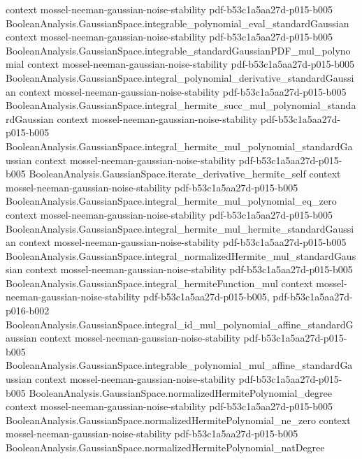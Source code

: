\begin{theorem}
  {context}
  {mossel-neeman-gaussian-noise-stability}
  {pdf-b53c1a5aa27d-p015-b005}
\proofstep
  {BooleanAnalysis.GaussianSpace.integrable_polynomial_eval_standardGaussian}
  {context}
  {mossel-neeman-gaussian-noise-stability}
  {pdf-b53c1a5aa27d-p015-b005}
\proofstep
  {BooleanAnalysis.GaussianSpace.integrable_standardGaussianPDF_mul_polynomial}
  {context}
  {mossel-neeman-gaussian-noise-stability}
  {pdf-b53c1a5aa27d-p015-b005}
\proofstep
  {BooleanAnalysis.GaussianSpace.integral_polynomial_derivative_standardGaussian}
  {context}
  {mossel-neeman-gaussian-noise-stability}
  {pdf-b53c1a5aa27d-p015-b005}
\proofstep
  {BooleanAnalysis.GaussianSpace.integral_hermite_succ_mul_polynomial_standardGaussian}
  {context}
  {mossel-neeman-gaussian-noise-stability}
  {pdf-b53c1a5aa27d-p015-b005}
\proofstep
  {BooleanAnalysis.GaussianSpace.integral_hermite_mul_polynomial_standardGaussian}
  {context}
  {mossel-neeman-gaussian-noise-stability}
  {pdf-b53c1a5aa27d-p015-b005}
\proofstep
  {BooleanAnalysis.GaussianSpace.iterate_derivative_hermite_self}
  {context}
  {mossel-neeman-gaussian-noise-stability}
  {pdf-b53c1a5aa27d-p015-b005}
\proofstep
  {BooleanAnalysis.GaussianSpace.integral_hermite_mul_polynomial_eq_zero}
  {context}
  {mossel-neeman-gaussian-noise-stability}
  {pdf-b53c1a5aa27d-p015-b005}
\proofstep
  {BooleanAnalysis.GaussianSpace.integral_hermite_mul_hermite_standardGaussian}
  {context}
  {mossel-neeman-gaussian-noise-stability}
  {pdf-b53c1a5aa27d-p015-b005}
\proofstep
  {BooleanAnalysis.GaussianSpace.integral_normalizedHermite_mul_standardGaussian}
  {context}
  {mossel-neeman-gaussian-noise-stability}
  {pdf-b53c1a5aa27d-p015-b005}
\proofstep
  {BooleanAnalysis.GaussianSpace.integral_hermiteFunction_mul}
  {context}
  {mossel-neeman-gaussian-noise-stability}
  {pdf-b53c1a5aa27d-p015-b005,
    pdf-b53c1a5aa27d-p016-b002}
\proofstep
  {BooleanAnalysis.GaussianSpace.integral_id_mul_polynomial_affine_standardGaussian}
  {context}
  {mossel-neeman-gaussian-noise-stability}
  {pdf-b53c1a5aa27d-p015-b005}
\proofstep
  {BooleanAnalysis.GaussianSpace.integrable_polynomial_mul_affine_standardGaussian}
  {context}
  {mossel-neeman-gaussian-noise-stability}
  {pdf-b53c1a5aa27d-p015-b005}
\proofstep
  {BooleanAnalysis.GaussianSpace.normalizedHermitePolynomial_degree}
  {context}
  {mossel-neeman-gaussian-noise-stability}
  {pdf-b53c1a5aa27d-p015-b005}
\proofstep
  {BooleanAnalysis.GaussianSpace.normalizedHermitePolynomial_ne_zero}
  {context}
  {mossel-neeman-gaussian-noise-stability}
  {pdf-b53c1a5aa27d-p015-b005}
\proofstep
  {BooleanAnalysis.GaussianSpace.normalizedHermitePolynomial_natDegree}

\end{theorem}
